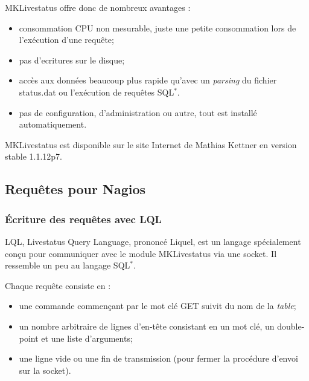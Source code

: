 \noindent MKLivestatus offre donc de nombreux avantages :

\begin{itemize}
	\item consommation CPU non mesurable, juste une petite consommation lors de l'ex\'ecution d'une requ\^ete;
	\item pas d'ecritures sur le disque;
	\item acc\`es aux donn\'ees beaucoup plus rapide qu'avec un \textit{parsing} du fichier \textsf{status.dat} ou l'ex\'ecution de requ\^etes SQL$^*$.
	\item pas de configuration, d'administration ou autre, tout est install\'e automatiquement.

\end{itemize}

\vspace{0.20cm}

MKLivestatus est disponible sur le site Internet\cite{biblio:siteMklivestatus} de Mathias Kettner en version stable 1.1.12p7.

\subsection{Requ\^etes pour Nagios}

\subsubsection{\'Ecriture des requ\^etes avec LQL}

LQL, Livestatus Query Language, prononc\'e \og Liquel\fg, est un langage sp\'ecialement con\c{c}u pour communiquer avec le module MKLivestatus via une socket.
Il ressemble un peu au langage SQL$^*$.

\noindent Chaque requ\^ete consiste en :

\begin{itemize}
	\item une commande commen\c{c}ant par le mot cl\'e \textsf{GET} suivit du nom de la \textit{table};
	\item un nombre arbitraire de lignes d'en-t\^ete consistant en un mot cl\'e, un double-point et une liste d'arguments;
	\item une ligne vide ou une fin de transmission (pour fermer la proc\'edure d'envoi sur la socket).

\end{itemize}

\vspace{0.20cm}

